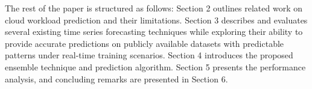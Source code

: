 The rest of the paper is structured as follows: Section 2 outlines related work on cloud workload prediction and their limitations. Section 3 describes and evaluates several existing time series forecasting techniques while exploring their ability to provide accurate predictions on publicly available datasets with predictable patterns under real-time training scenarios. Section 4 introduces the proposed ensemble technique and prediction algorithm. Section 5 presents the performance analysis, and concluding remarks are presented in Section 6.